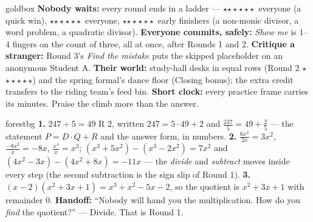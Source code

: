 \documentclass[10pt]{article}
\newcommand{\rung}[1]{{\color{goldacc}\ifcase#1\or$\star$\or$\star\star$\or$\star\star\star$\fi}}
\begin{document}
\begin{skillbox}{goldbox}
\textbf{Nobody waits:} every round ends in a ladder --- \rung1\ everyone (a quick win),
\rung2\ everyone, \rung3\ early finishers (a non-monic divisor, a word problem, a quadratic
divisor). \textbf{Everyone commits, safely:} \emph{Show me} is 1--4 fingers on the count of
three, all at once, after Rounds 1 and 2. \textbf{Critique a stranger:} Round 3's \emph{Find the
mistake} puts the skipped placeholder on an anonymous Student A. \textbf{Their world:} study-hall
desks in equal rows (Round 2 \rung3) and the spring formal's dance floor (Closing bonus); the
extra credit transfers to the riding team's feed bin. \textbf{Short clock:} every practice frame
carries its minutes. Praise the climb more than the answer.
\end{skillbox}

\begin{skillbox}{forestbg}
\textbf{1.} $247 \div 5 = 49$ R $2$, written $247 = 5\cdot49 + 2$ and $\frac{247}{5} = 49 +
\frac25$ --- the statement $P = D\cdot Q + R$ and the answer form, in numbers.
\textbf{2.} $\frac{6x^3}{2x} = 3x^2$, $\frac{-8x^2}{x} = -8x$, $\frac{x^4}{x} = x^3$;
$(x^3 + 5x^2) - (x^3 - 2x^2) = 7x^2$ and $(4x^2 - 3x) - (4x^2 + 8x) = -11x$ --- the
\emph{divide} and \emph{subtract} moves inside every step (the second subtraction is the sign
slip of Round 1). \textbf{3.} $(x - 2)(x^2 + 3x + 1) = x^3 + x^2 - 5x - 2$, so the quotient is
$x^2 + 3x + 1$ with remainder $0$. \textbf{Handoff:} ``Nobody will hand you the
multiplication. How do you \emph{find} the quotient?'' --- Divide. That is Round 1.
\end{skillbox}
\end{document}

